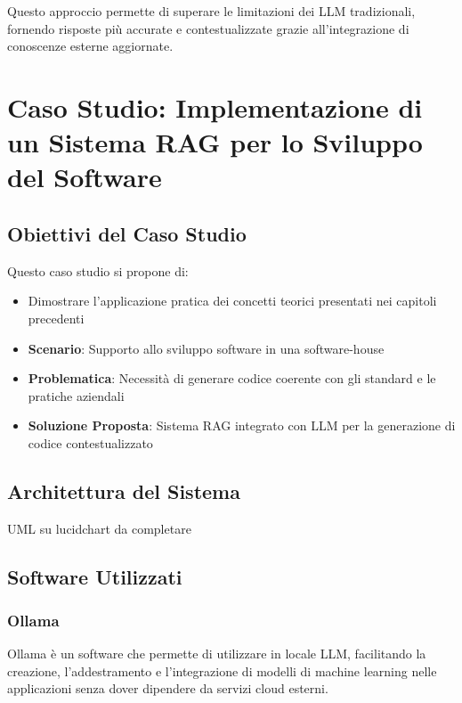 \documentclass[12pt,a4paper,openright,twoside]{book}
\begin{document}
Questo approccio permette di superare le limitazioni dei LLM tradizionali, fornendo risposte più accurate e contestualizzate grazie all'integrazione di conoscenze esterne aggiornate.

\chapter{Caso Studio: Implementazione di un Sistema RAG per lo Sviluppo del Software}

\section{Obiettivi del Caso Studio}
Questo caso studio si propone di:
\begin{itemize}
    \item Dimostrare l'applicazione pratica dei concetti teorici presentati nei capitoli precedenti
    \item \textbf{Scenario}: Supporto allo sviluppo software in una software-house
    \item \textbf{Problematica}: Necessità di generare codice coerente con gli standard e le pratiche aziendali
    \item \textbf{Soluzione Proposta}: Sistema RAG integrato con LLM per la generazione di codice contestualizzato
\end{itemize}


\section{Architettura del Sistema}
UML su lucidchart da completare

\section{Software Utilizzati}
\subsection{Ollama}
Ollama \cite{ollama-docs} è un software che permette di utilizzare in locale LLM, facilitando la creazione, l'addestramento e l'integrazione di modelli di machine learning nelle applicazioni senza dover dipendere da servizi cloud esterni.
\end{document}
